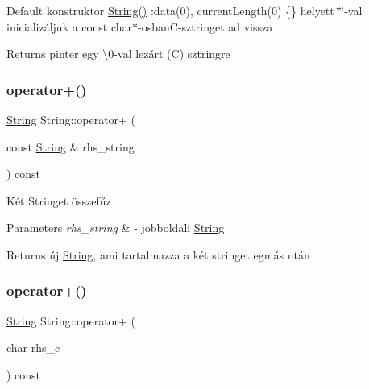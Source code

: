 Default konstruktor \mbox{\hyperlink{class_string_a1fdfe981d2c5e0075c1669dd94553082}{String()}} \+:data(0), current\+Length(0) \{\} helyett \char`\"{}\char`\"{}-\/val inicializáljuk a const char$\ast$-\/osban\+C-\/sztringet ad vissza \begin{DoxyReturn}{Returns}
pinter egy \textquotesingle{}\textbackslash{}0\textquotesingle{}-\/val lezárt (C) sztringre 
\end{DoxyReturn}
\mbox{\label{class_string_a71bdf63295b700150845aebc2fe6eba0}} 
\subsubsection{\texorpdfstring{operator+()}{operator+()}\hspace{0.1cm}{\footnotesize\ttfamily [1/4]}}
{\footnotesize\ttfamily \mbox{\hyperlink{class_string}{String}} String\+::operator+ (\begin{DoxyParamCaption}\item[{const \mbox{\hyperlink{class_string}{String}} \&}]{rhs\+\_\+string }\end{DoxyParamCaption}) const}

Két Stringet összefűz 
\begin{DoxyParams}{Parameters}
{\em rhs\+\_\+string} & -\/ jobboldali \mbox{\hyperlink{class_string}{String}} \\
\hline
\end{DoxyParams}
\begin{DoxyReturn}{Returns}
új \mbox{\hyperlink{class_string}{String}}, ami tartalmazza a két stringet egmás után 
\end{DoxyReturn}
\mbox{\label{class_string_abb187e5ab66fe29c42aed4845b55dd76}} 
\subsubsection{\texorpdfstring{operator+()}{operator+()}\hspace{0.1cm}{\footnotesize\ttfamily [2/4]}}
{\footnotesize\ttfamily \mbox{\hyperlink{class_string}{String}} String\+::operator+ (\begin{DoxyParamCaption}\item[{char}]{rhs\+\_\+c }\end{DoxyParamCaption}) const\hspace{0.3cm}{\ttfamily [inline]}}

